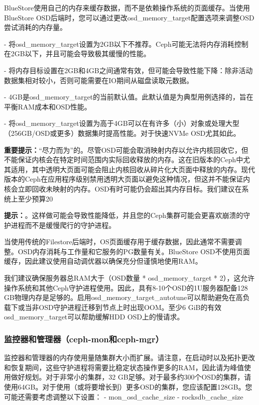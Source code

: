 \documentclass[12pt,UTF8]{ctexbook}
\begin{document}
BlueStore使用自己的内存来缓存数据，而不是依赖操作系统的页面缓存。当使用BlueStore OSD后端时，您可以通过更改osd_memory_target配置选项来调整OSD尝试消耗的内存量。

- 将osd_memory_target设置为2GB以下不推荐。Ceph可能无法将内存消耗控制在2GB以下，并且可能会导致极其缓慢的性能。

- 将内存目标设置在2GB和4GB之间通常有效，但可能会导致性能下降：除非活动数据集相对较小，否则可能需要在IO期间从磁盘读取元数据。

- 4GB是osd_memory_target的当前默认值。此默认值是为典型用例选择的，旨在平衡RAM成本和OSD性能。

- 将osd_memory_target设置为高于4GB可以在有许多（小）对象或处理大型（256GB/OSD或更多）数据集时提高性能。对于快速NVMe OSD尤其如此。

\textbf{重要提示：}“尽力而为”的。尽管OSD可能会取消映射内存以允许内核回收它，但不能保证内核会在特定时间范围内实际回收释放的内存。这在旧版本的Ceph中尤其适用，其中透明大页面可能会阻止内核回收从碎片化大页面中释放的内存。现代版本的Ceph在应用程序级别禁用透明大页面以避免这种情况，但这并不能保证内核会立即回收未映射的内存。OSD有时可能仍会超出其内存目标。我们建议在系统上至少预算20%

\textbf{提示：}。这样做可能会导致性能降低，并且您的Ceph集群可能会更喜欢崩溃的守护进程而不是缓慢爬行的守护进程。

当使用传统的Filestore后端时，OS页面缓存用于缓存数据，因此通常不需要调整。OSD内存消耗与工作量和它服务的PG数量有关。BlueStore OSD不使用页面缓存，因此建议使用自动调优器以确保充分但谨慎地使用RAM。

我们建议确保服务器总RAM大于（OSD数量 * osd_memory_target * 2），这允许操作系统和其他Ceph守护进程使用。因此，具有8-10个OSD的1U服务器配备128 GB物理内存是足够的。启用osd_memory_target_autotune可以帮助避免在高负载下或当非OSD守护进程迁移到节点上时出现OOM。至少6 GiB的有效osd_memory_target可以帮助缓解HDD OSD上的慢请求。

\subsubsection{监控器和管理器（ceph-mon和ceph-mgr）}
监控器和管理器的内存使用量随集群大小而扩展。请注意，在启动时以及拓扑更改和恢复期间，这些守护进程将需要比稳定状态操作更多的RAM，因此请为峰值使用做好规划。对于非常小的集群，32 GB足够。对于最多约300个OSD的集群，请使用64GB。对于使用（或将要增长到）更多OSD的集群，您应该配置128GB。您可能还需要考虑调整以下设置：
- mon_osd_cache_size
- rocksdb_cache_size
\end{document}
